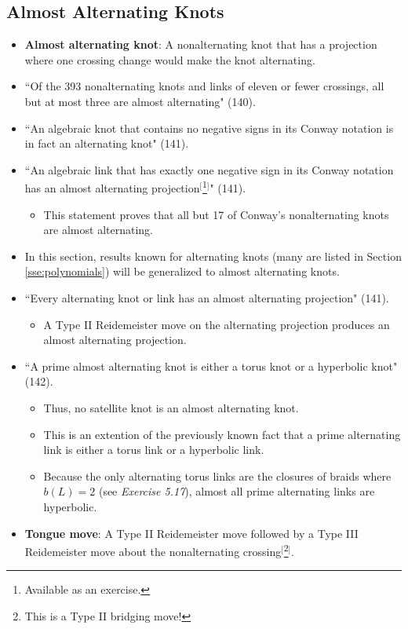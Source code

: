 \documentclass[titlepage]{article}
\numberwithin{figure}{section}
\numberwithin{table}{section}
\numberwithin{equation}{section}
\newcommand{\dq}[2]{``#1" (#2).}
\begin{document}
\subsection{Almost Alternating Knots}
\begin{itemize}
    \item \textbf{Almost alternating knot}: A nonalternating knot that has a projection where one crossing change would make the knot alternating.
    \item \dq{Of the 393 nonalternating knots and links of eleven or fewer crossings, all but at most three are almost alternating}{140}
    \item \dq{An algebraic knot that contains no negative signs in its Conway notation is in fact an alternating knot}{141}
    \item \dq{An algebraic link that has exactly one negative sign in its Conway notation has an almost alternating projection$^[$\footnote{Available as an exercise.}$^]$}{141}
    \begin{itemize}
        \item This statement proves that all but 17 of Conway's nonalternating knots are almost alternating.
    \end{itemize}
    \item In this section, results known for alternating knots (many are listed in Section \ref{sse:polynomials}) will be generalized to almost alternating knots.
    \item \dq{Every alternating knot or link has an almost alternating projection}{141}
    \begin{itemize}
        \item A Type II Reidemeister move on the alternating projection produces an almost alternating projection.
    \end{itemize}
    \item \dq{A prime almost alternating knot is either a torus knot or a hyperbolic knot}{142}
    \begin{itemize}
        \item Thus, no satellite knot is an almost alternating knot.
        \item This is an extention of the previously known fact that a prime alternating link is either a torus link or a hyperbolic link.
        \item Because the only alternating torus links are the closures of braids where $b(L)=2$ (see \emph{Exercise 5.17}), almost all prime alternating links are hyperbolic.
    \end{itemize}
    \item \textbf{Tongue move}: A Type II Reidemeister move followed by a Type III Reidemeister move about the nonalternating crossing$^[$\footnote{This is a Type II bridging move!}$^]$.
    \begin{figure}[h!]
        \centering
\end{figure}
\end{itemize}
\end{document}
